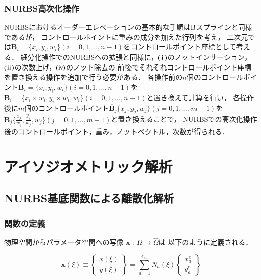 \subsubsection{NURBS高次化操作}
NURBSにおけるオーダーエレベーションの基本的な手順はBスプラインと同様であるが，
コントロールポイントに重みの成分を加えた行列を考え，
二次元では$\boldsymbol{B}_i = \{x_i, y_i, w_i\}(i=0,1,\dots,n-1)$をコントロールポイント座標として考える．
細分化操作でのNURBSへの拡張と同様に，$\rm(\hspace{.18em}i\hspace{.18em})$のノットインサーション，
$\rm(\hspace{.08em}ii\hspace{.08em})$の次数上げ，$\rm(i\hspace{-.08em}v\hspace{-.06em})$のノット除去の
前後でそれぞれコントロールポイント座標を置き換える操作を追加で行う必要がある．
各操作前の$n$個のコントロールポイント$\boldsymbol{B}_i = \{x_i, y_i, w_i\}(i=0,1,\dots,n-1)$を
$\boldsymbol{B}_i = \{x_i\times w_i, y_i\times w_i, w_i\}(i=0,1,\dots,n-1)$と置き換えて計算を行い，
各操作後に$m$個のコントロールポイント$\overline{\boldsymbol{B}}_j\{x_j, y_j, w_j\}(j=0,1,\dots,m-1)$を
$\overline{\boldsymbol{B}}_j\{\frac{x_j}{w_j}, \frac{y_j}{w_j}, w_j\}(j=0,1,\dots,m-1)$と置き換えることで，
NURBSでの高次化操作後のコントロールポイント，重み，ノットベクトル，次数が得られる．

\newpage

\section{アイソジオメトリック解析}
\subsection{NURBS基底関数による離散化解析}
\subsubsection{関数の定義}
物理空間からパラメータ空間への写像
$\boldsymbol{x}\ :\ \Omega \rightarrow \hat{\Omega}$は
以下のように定義される．

\begin{equation}
  \label{eq:difinement of u}
  \boldsymbol{x}(\xi)\equiv
  \begin{Bmatrix}
    x(\xi)\\
    y(\xi)
  \end{Bmatrix}
    =\sum_{a=1}^{e_{en}}N_a(\xi)
  \begin{Bmatrix}
    x^e_a\\y^e_a
  \end{Bmatrix}
\end{equation}

